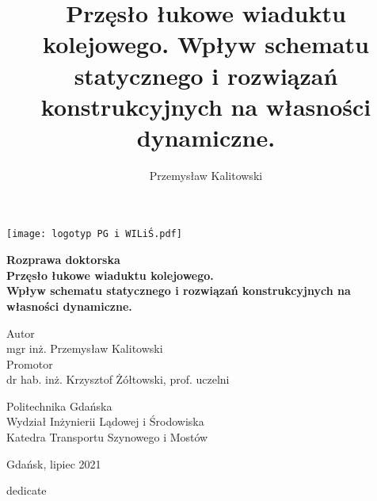 
\title{Przęsło łukowe wiaduktu kolejowego. Wpływ schematu statycznego i rozwiązań konstrukcyjnych na własności dynamiczne.}
\author{Przemysław Kalitowski}










	
\begin{titlepage}
	\begin{center}
		\texttt{[image: logotyp PG i WILiŚ.pdf]}
		\vspace{3cm}
		
		\Large
		\textbf{Rozprawa doktorska\\}
		\vspace{1cm}
		\LARGE
		\textbf{Przęsło łukowe wiaduktu kolejowego.\\Wpływ schematu statycznego i rozwiązań konstrukcyjnych na własności dynamiczne.}
		
	
		\vspace{2cm}
		
		\large
		Autor\\mgr inż. Przemysław Kalitowski \\
		\vspace{0.5cm}
		Promotor\\dr hab. inż. Krzysztof Żółtowski, prof. uczelni
		\vfill
		

		\large
		
		Politechnika Gdańska\\
		Wydział Inżynierii Lądowej i Środowiska\\
		Katedra Transportu Szynowego i Mostów
		
		\vspace{1cm}
		Gdańsk, lipiec 2021
		
	\end{center}
\end{titlepage}


\myemptypage

\vspace*{20cm}
\hfill dedicate
\newpage

\myemptypage

\tableofcontents
\listoftables


